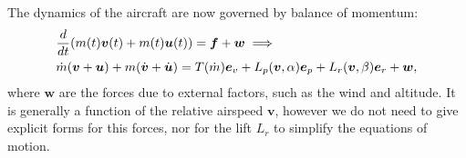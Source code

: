 \documentclass{article}
\renewcommand{\vec}[1]{\boldsymbol{#1}}
\begin{document}
The dynamics of the aircraft are now governed by balance of momentum:
\begin{align}
   \notag & \frac{d}{dt} (m(t) \vec{v}(t) + m(t) \vec{u}(t)) = \vec{f} + \vec{w} \implies
\\ \label{eqns:motion-vector}
    & \dot{m}(\vec{v}+ \vec u) + m (\dot{\vec{v}} + \dot{\vec{u}}) = T(\dot{m}) \vec e_{v} + {L_p}(\vec v, \alpha) \vec{e}_p  + {L_r}(\vec v,\beta) \vec{e}_r + \vec w,
\end{align}
where $\vec w$ are the forces due to external factors, such as the wind and altitude. It is generally a function of the relative airspeed $\vec v$, however we do not need to give explicit forms for this forces, nor for the lift $L_r$ to simplify the equations of motion. 
\end{document}
